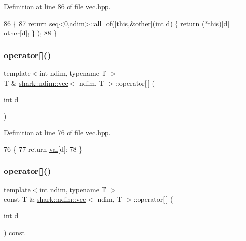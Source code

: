 Definition at line 86 of file vec.\+hpp.


\begin{DoxyCode}
86                                                                           \{
87             \textcolor{keywordflow}{return} seq<0,ndim>::all\_of([\textcolor{keyword}{this},&other](\textcolor{keywordtype}{int} d) \{ \textcolor{keywordflow}{return} (*\textcolor{keyword}{this})[d] == other[d]; \} );
88         \}
\end{DoxyCode}
\hypertarget{structshark_1_1ndim_1_1vec_ab5506a5f5d9f1f8a2722626620fa305c}{}\label{structshark_1_1ndim_1_1vec_ab5506a5f5d9f1f8a2722626620fa305c} 
\subsubsection{\texorpdfstring{operator[]()}{operator[]()}\hspace{0.1cm}{\footnotesize\ttfamily [1/2]}}
{\footnotesize\ttfamily template$<$int ndim, typename T $>$ \\
T \& \hyperlink{structshark_1_1ndim_1_1vec}{shark\+::ndim\+::vec}$<$ ndim, T $>$\+::operator\mbox{[}$\,$\mbox{]} (\begin{DoxyParamCaption}\item[{int}]{d }\end{DoxyParamCaption})\hspace{0.3cm}{\ttfamily [inline]}}



Definition at line 76 of file vec.\+hpp.


\begin{DoxyCode}
76                                                \{
77             \textcolor{keywordflow}{return} \hyperlink{structshark_1_1ndim_1_1vec_a1769eccc65b4b95dced51726c271d077}{val}[d];
78         \}
\end{DoxyCode}
\hypertarget{structshark_1_1ndim_1_1vec_a7ef60f43a2b6e0429a85ab67f323bd59}{}\label{structshark_1_1ndim_1_1vec_a7ef60f43a2b6e0429a85ab67f323bd59} 
\subsubsection{\texorpdfstring{operator[]()}{operator[]()}\hspace{0.1cm}{\footnotesize\ttfamily [2/2]}}
{\footnotesize\ttfamily template$<$int ndim, typename T $>$ \\
const T \& \hyperlink{structshark_1_1ndim_1_1vec}{shark\+::ndim\+::vec}$<$ ndim, T $>$\+::operator\mbox{[}$\,$\mbox{]} (\begin{DoxyParamCaption}\item[{int}]{d }\end{DoxyParamCaption}) const\hspace{0.3cm}{\ttfamily [inline]}}



